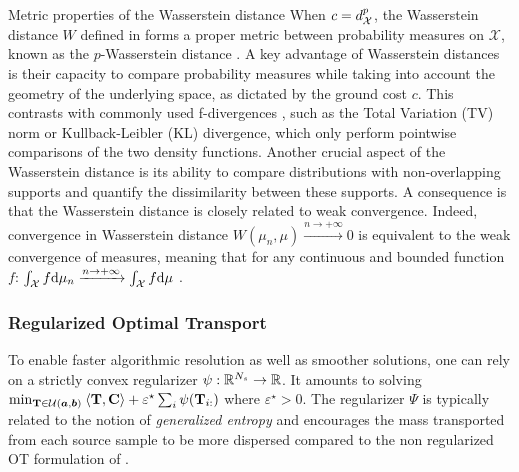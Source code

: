 \begin{mem1}{Metric properties of the Wasserstein distance}
    When \( c = d_{{\mathcal{X}}}^p \), the Wasserstein distance \( W \) defined in  forms a proper metric between probability measures on \( \mathcal{X} \), known as the \( p \)-Wasserstein distance \citep{villani2009optimal}. A key advantage of Wasserstein distances is their capacity to compare probability measures while taking into account the geometry of the underlying space, as dictated by the ground cost \( c \). This contrasts with commonly used f-divergences \citep{csiszar1967information}, such as the Total Variation (TV) norm or Kullback-Leibler (KL) divergence, which only perform pointwise comparisons of the two density functions. Another crucial aspect of the Wasserstein distance is its ability to compare distributions with non-overlapping supports and quantify the dissimilarity between these supports. A consequence is that the Wasserstein distance is closely related to weak convergence. Indeed, convergence in Wasserstein distance \( W(\mu_n,\mu) \xrightarrow{n \to +\infty} 0 \) is equivalent to the weak convergence of measures, meaning that for any continuous and bounded function $f$: $\int_{{\mathcal{X}}} f \mathrm{d}\mu_n \xrightarrow{n \to +\infty} \int_{{\mathcal{X}}} f \mathrm{d}\mu$ \citep{villani2009optimal}.
\end{mem1}


\subsubsection{Regularized Optimal Transport}

To enable faster algorithmic resolution as well as smoother solutions, one can rely on a strictly convex regularizer $\psi : \mathbb{R}^{N_s} \to \mathbb{R}$. It amounts to solving $\min_{{\mathbf{T}} \in {\mathcal{U}}(\bm{a}, \bm{b})} \: \langle {\mathbf{T}}, \mathbf{C} \rangle + \varepsilon^\star \sum_i \psi({\mathbf{T}}_{i:})$ where $\varepsilon^\star > 0$. The regularizer $\Psi$ is typically related to the notion of \emph{generalized entropy} \citep{blondel2020learning} and encourages the mass transported from each source sample to be more dispersed compared to the non regularized OT formulation of .

